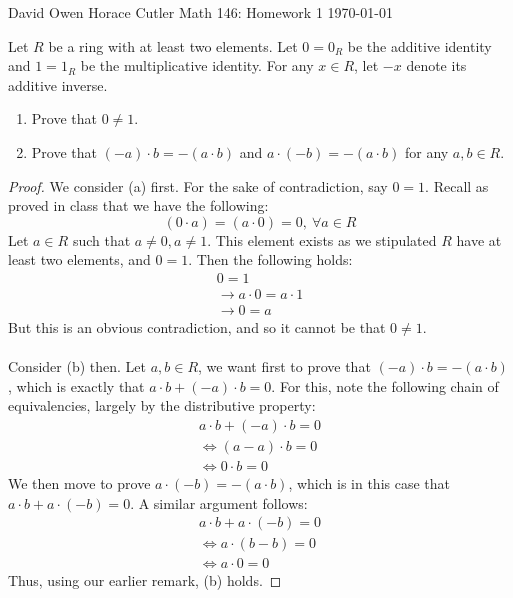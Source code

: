 \documentclass[12pt]{article}
\newenvironment{ex}[2][Exercise]{\begin{trivlist}
\item[\hskip \labelsep {\bfseries #1}\hskip \labelsep {\bfseries #2.}]}{\end{trivlist}}
\newenvironment{sol}[1][Solution]{\begin{trivlist}
\item[\hskip \labelsep {\bfseries #1:}]}{\end{trivlist}}
\begin{document}
\noindent David Owen Horace Cutler \hfill {\Large Math 146: Homework 1} \hfill \today

\begin{ex}{1}
    Let $R$ be a ring with at least two elements. Let $0 = 0_R$ be the additive identity and $1 = 1_R$ be the multiplicative identity. For any $x \in R$, let $-x$ denote its additive inverse.
    \begin{enumerate}[label=(\alph*)]
        \item Prove that $0 \neq 1$.
        \item Prove that $(-a) \cdot b = -(a \cdot b)$ and $a \cdot (-b) = -(a \cdot b)$ for any $a, b \in R$.
    \end{enumerate}
\end{ex}
\begin{sol}
    \begin{proof}
        We consider (a) first. For the sake of contradiction, say $0 = 1$. Recall as proved in class that we have the following:
        $$(0 \cdot a) = (a \cdot 0) = 0, \: \forall a \in R$$
    Let $a \in R$ such that $a \neq 0, a \neq 1$. This element exists as we stipulated $R$ have at least two elements, and $0 = 1$. Then the following holds:
    \begin{equation}
        \begin{aligned}
            0 = 1 \\
            \rightarrow a \cdot 0 = a \cdot 1 \\
            \rightarrow 0 = a
        \end{aligned}
    \end{equation}
    But this is an obvious contradiction, and so it cannot be that $0 \neq 1$. \\ \\
    Consider (b) then. Let $a, b \in R$, we want first to prove that $(-a) \cdot b = -(a \cdot b)$, which is exactly that $a \cdot b + (-a) \cdot b = 0$. For this, note the following chain of equivalencies, largely by the distributive property:
    \begin{equation}
        \begin{aligned}
            a \cdot b + (-a) \cdot b = 0 \\
            \Leftrightarrow (a - a) \cdot b = 0 \\
            \Leftrightarrow 0 \cdot b = 0
        \end{aligned}
    \end{equation}
    We then move to prove $a \cdot (-b) = -(a \cdot b)$, which is in this case that $a \cdot b + a \cdot (-b) = 0$. A similar argument follows:
    \begin{equation}
        \begin{aligned}
            a \cdot b + a \cdot (-b) = 0 \\
            \Leftrightarrow a \cdot (b - b) = 0 \\
            \Leftrightarrow a \cdot 0 = 0
        \end{aligned}
    \end{equation}
    Thus, using our earlier remark, (b) holds. 
    \end{proof}
\end{sol}
\end{document}
